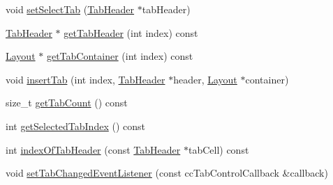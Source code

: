 \begin{Indent}
\begin{DoxyCompactItemize}
void \hyperlink{classui_1_1TabControl_a4312f6e1d6c73d858fc662443b623e93}{set\+Select\+Tab} (\hyperlink{classui_1_1TabHeader}{Tab\+Header} $\ast$tab\+Header)
\item 
\hyperlink{classui_1_1TabHeader}{Tab\+Header} $\ast$ \hyperlink{classui_1_1TabControl_a1cb2ef78d7a3ec78979b0e73432964d7}{get\+Tab\+Header} (int index) const
\item 
\hyperlink{classui_1_1Layout}{Layout} $\ast$ \hyperlink{classui_1_1TabControl_a92075148e4191162362183f3729abc60}{get\+Tab\+Container} (int index) const
\item 
void \hyperlink{classui_1_1TabControl_a12d623c4549b6175cdeb1db13d4dfedf}{insert\+Tab} (int index, \hyperlink{classui_1_1TabHeader}{Tab\+Header} $\ast$header, \hyperlink{classui_1_1Layout}{Layout} $\ast$container)
\item 
size\+\_\+t \hyperlink{classui_1_1TabControl_a85ad9aa8633df37bd11b99ecce6ad8ee}{get\+Tab\+Count} () const
\item 
int \hyperlink{classui_1_1TabControl_ac446282790475b8afcfe3e5b81afac2a}{get\+Selected\+Tab\+Index} () const
\item 
int \hyperlink{classui_1_1TabControl_a4783116cb27769670ed4c4eff9c0985b}{index\+Of\+Tab\+Header} (const \hyperlink{classui_1_1TabHeader}{Tab\+Header} $\ast$tab\+Cell) const
\item 
void \hyperlink{classui_1_1TabControl_a16fecfa3c0550e2afcfe9280aa633ada}{set\+Tab\+Changed\+Event\+Listener} (const cc\+Tab\+Control\+Callback \&callback)
\end{DoxyCompactItemize}
\end{Indent}
\textbf{ }\par

